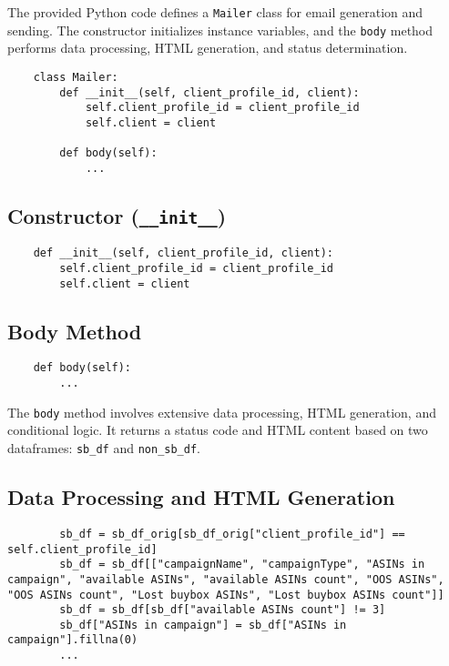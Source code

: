 The provided Python code defines a \texttt{Mailer} class for email generation and sending. The constructor initializes instance variables, and the \texttt{body} method performs data processing, HTML generation, and status determination.

\begin{lstlisting}
    class Mailer:
        def __init__(self, client_profile_id, client):
            self.client_profile_id = client_profile_id
            self.client = client
    
        def body(self):
            ...
\end{lstlisting}

\subsection{Constructor (\texttt{\_\_init\_\_})}
\begin{lstlisting}
    def __init__(self, client_profile_id, client):
        self.client_profile_id = client_profile_id
        self.client = client
\end{lstlisting}

\subsection{Body Method}
\begin{lstlisting}
    def body(self):
        ...
\end{lstlisting}

The \texttt{body} method involves extensive data processing, HTML generation, and conditional logic. It returns a status code and HTML content based on two dataframes: \texttt{sb\_df} and \texttt{non\_sb\_df}.

\subsection{Data Processing and HTML Generation}
\begin{lstlisting}
        sb_df = sb_df_orig[sb_df_orig["client_profile_id"] == self.client_profile_id]
        sb_df = sb_df[["campaignName", "campaignType", "ASINs in campaign", "available ASINs", "available ASINs count", "OOS ASINs", "OOS ASINs count", "Lost buybox ASINs", "Lost buybox ASINs count"]]
        sb_df = sb_df[sb_df["available ASINs count"] != 3]
        sb_df["ASINs in campaign"] = sb_df["ASINs in campaign"].fillna(0)
        ...
\end{lstlisting}

